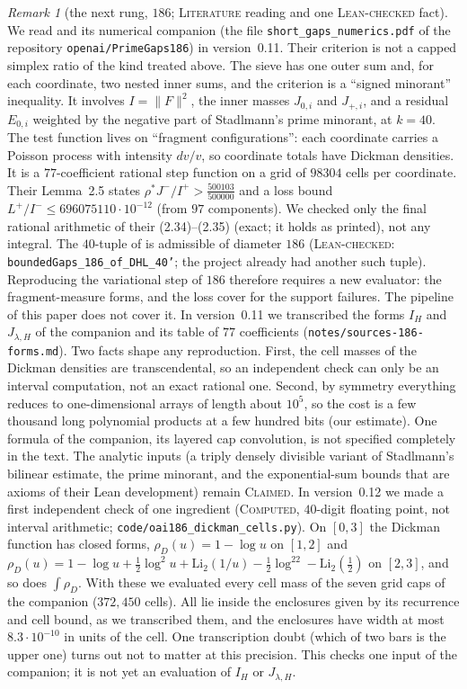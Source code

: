 \documentclass[11pt]{amsart}
\theoremstyle{definition}
\theoremstyle{remark}
\newtheorem{remark}[theorem]{Remark}
\newcommand{\lbl}[1]{\textup{\textsc{#1}}}
\begin{document}
\begin{remark}[the next rung, $186$; \lbl{Literature} reading and one \lbl{Lean-checked} fact]\label{rem:oai186}
We read \cite{OAI26} and its numerical companion (the file
\texttt{short\_gaps\_numerics.pdf} of the repository \texttt{openai/PrimeGaps186}) in version~0.11.
Their criterion is not a capped simplex ratio of the kind treated above.
The sieve has one outer sum and, for each coordinate, two nested inner sums,
and the criterion \cite[Theorem~4.5]{OAI26} is a ``signed minorant''
inequality. It involves $I=\|F\|^2$, the inner masses
$J_{0,i}$ and $J_{+,i}$, and a residual $E_{0,i}$ weighted by the negative
part of Stadlmann's prime minorant, at $k=40$.
The test function lives on ``fragment configurations'': each coordinate carries
a Poisson process with intensity $dv/v$, so coordinate totals have Dickman
densities. It is a $77$-coefficient rational step function on a grid of
$98304$ cells per coordinate. Their Lemma~2.5 states
$\rho^*J^-/I^+>\frac{500103}{500000}$ and a loss bound
$L^+/I^-\le 696075110\cdot10^{-12}$ (from $97$ components). We checked only the
final rational arithmetic of their (2.34)--(2.35) (exact; it holds as printed),
not any integral. The $40$-tuple of \cite[(1.3)]{OAI26} is admissible of diameter
$186$ (\lbl{Lean-checked}: \texttt{boundedGaps\_186\_of\_DHL\_40'}; the project
already had another such tuple). Reproducing the variational step of $186$ therefore
requires a new evaluator: the fragment-measure forms, and the loss cover for the
support failures. The pipeline of this paper does not cover it. In version~0.11
we transcribed the forms $I_H$ and $J_{\lambda,H}$ of the companion and its
table of $77$ coefficients (\texttt{notes/sources-186-forms.md}). Two facts
shape any reproduction. First, the cell masses of the Dickman densities are
transcendental, so an independent check can only be an interval computation, not an
exact rational one. Second, by symmetry everything reduces to one-dimensional
arrays of length about $10^5$, so the cost is a few thousand long polynomial
products at a few hundred bits (our estimate). One formula of the companion,
its layered cap convolution, is not specified completely in the text.
The analytic inputs (a triply densely divisible variant of Stadlmann's
bilinear estimate, the prime minorant, and the exponential-sum bounds that are
axioms of their Lean development) remain \lbl{Claimed}.
In version~0.12 we made a first independent check of one ingredient
(\lbl{Computed}, $40$-digit floating point, not interval arithmetic;
\texttt{code/oai186\_dickman\_cells.py}). On $[0,3]$ the Dickman function has
closed forms, $\rho_D(u)=1-\log u$ on $[1,2]$ and
$\rho_D(u)=1-\log u+\frac12\log^2u+\mathrm{Li}_2(1/u)-\frac12\log^22-\mathrm{Li}_2(\frac12)$
on $[2,3]$, and so does $\int\rho_D$. With these we evaluated every cell mass of the seven grid caps
of the companion ($372{,}450$ cells). All lie inside the enclosures given by
its recurrence and cell bound, as we transcribed them, and the enclosures have
width at most $8.3\cdot10^{-10}$ in units of the cell. One transcription doubt
(which of two bars is the upper one) turns out not to matter at this precision.
This checks one input of the companion; it is not yet an evaluation of
$I_H$ or $J_{\lambda,H}$.
\end{remark}
\end{document}
